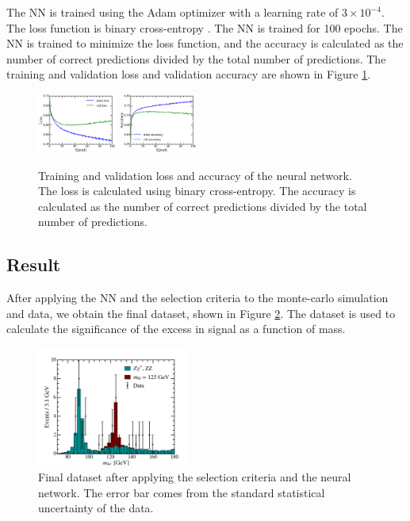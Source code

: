 The NN is trained using the Adam optimizer \cite{kingma2014adam} with a learning rate of $3\times10^{-4}$. The loss function is binary cross-entropy \cite{goodfellow2016deep}. The NN is trained for 100 epochs. The NN is trained to minimize the loss function, and the accuracy is calculated as the number of correct predictions divided by the total number of predictions. The training and validation loss and validation accuracy are shown in Figure \ref{fig:accuracy}. 
\begin{figure}[h]
  \centering
  \includegraphics[width=0.23\textwidth]{Figures/training_loss.png}
  \includegraphics[width=0.23\textwidth]{Figures/training_accuracy.png}
  \caption{Training and validation loss and accuracy of the neural network. The loss is calculated using binary cross-entropy. The accuracy is calculated as the number of correct predictions divided by the total number of predictions.}
  \label{fig:accuracy}
\end{figure}

\subsection{Result}

After applying the NN and the selection criteria to the monte-carlo simulation and data, we obtain the final dataset, shown in Figure \ref{fig:dataset}. The dataset is used to calculate the significance of the excess in signal as a function of mass. 

\begin{figure}[h]
  \centering
  \includegraphics[width=0.45\textwidth]{Figures/data.png}
  \caption{Final dataset after applying the selection criteria and the neural network. The error bar comes from the standard statistical uncertainty of the data.}
  \label{fig:dataset}
\end{figure}


